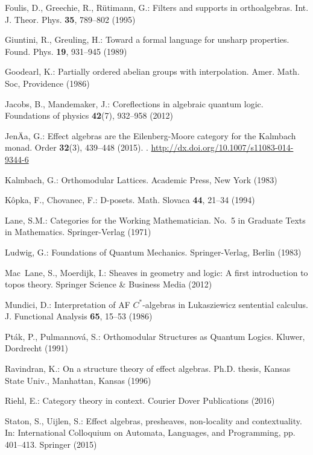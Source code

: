 \documentclass[smallextended]{svjour3}
\begin{document}
\begin{thebibliography}{10}
Foulis, D., Greechie, R., R{\"u}timann, G.: Filters and supports in
  orthoalgebras.
\newblock Int. J. Theor. Phys. \textbf{35}, 789--802 (1995)

Giuntini, R., Greuling, H.: Toward a formal language for unsharp properties.
\newblock Found. Phys. \textbf{19}, 931--945 (1989)

Goodearl, K.: Partially ordered abelian groups with interpolation.
\newblock Amer. Math. Soc, Providence (1986)

Jacobs, B., Mandemaker, J.: Coreflections in algebraic quantum logic.
\newblock Foundations of physics \textbf{42}(7), 932--958 (2012)

JenÄa, G.: Effect algebras are the {E}ilenberg-{M}oore category for the
  {K}almbach monad.
\newblock Order \textbf{32}(3), 439--448 (2015).
\newblock {}.
\newblock \urlprefix\url{http://dx.doi.org/10.1007/s11083-014-9344-6}

Kalmbach, G.: Orthomodular Lattices.
\newblock Academic Press, New York (1983)

K{\^o}pka, F., Chovanec, F.: D-posets.
\newblock Math. Slovaca \textbf{44}, 21--34 (1994)

Lane, S.M.: Categories for the Working Mathematician.
\newblock No.~5 in Graduate Texts in Mathematics. Springer-Verlag (1971)

Ludwig, G.: Foundations of Quantum Mechanics.
\newblock Springer-Verlag, Berlin (1983)

Mac~Lane, S., Moerdijk, I.: Sheaves in geometry and logic: A first introduction
  to topos theory.
\newblock Springer Science \& Business Media (2012)

Mundici, D.: Interpretation of {A}{F} ${C}^*$-algebras in {L}ukasziewicz
  sentential calculus.
\newblock J. Functional Analysis \textbf{65}, 15--53 (1986)

Pt{\'a}k, P., Pulmannov{\'a}, S.: Orthomodular Structures as Quantum Logics.
\newblock Kluwer, Dordrecht (1991)

Ravindran, K.: On a structure theory of effect algebras.
\newblock Ph.D. thesis, Kansas State Univ., Manhattan, Kansas (1996)

Riehl, E.: Category theory in context.
\newblock Courier Dover Publications (2016)

Staton, S., Uijlen, S.: Effect algebras, presheaves, non-locality and
  contextuality.
\newblock In: International Colloquium on Automata, Languages, and Programming,
  pp. 401--413. Springer (2015)

\end{thebibliography}
\end{document}
